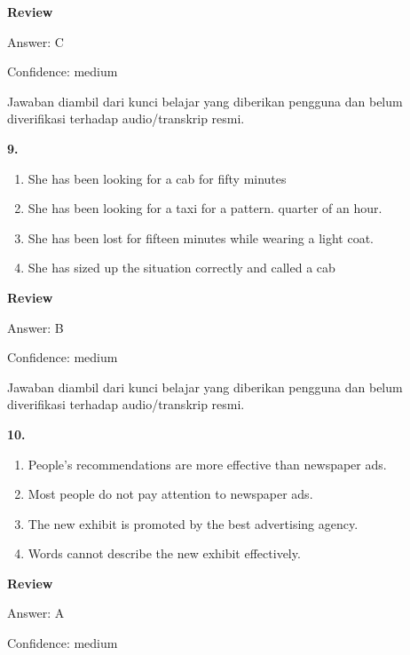 \documentclass[12pt]{article}
\begin{document}
\par
\begingroup
\setlength{\parskip}{0pt}
\setlength{\parindent}{0pt}
\textbf{Review}\par
Answer: C\par
Confidence: medium\par
Jawaban diambil dari kunci belajar yang diberikan pengguna dan belum diverifikasi terhadap audio/transkrip resmi.\par
\endgroup
\par
\vspace{0.25\baselineskip}
\noindent\textbf{9.}
\begin{enumerate}[label=(\Alph*),leftmargin=*,itemsep=0.2em]
\item She has been looking for a cab for fifty minutes
\item She has been looking for a taxi for a pattern. quarter of an hour.
\item She has been lost for fifteen minutes while wearing a light coat.
\item She has sized up the situation correctly and called a cab
\end{enumerate}
\par
\begingroup
\setlength{\parskip}{0pt}
\setlength{\parindent}{0pt}
\textbf{Review}\par
Answer: B\par
Confidence: medium\par
Jawaban diambil dari kunci belajar yang diberikan pengguna dan belum diverifikasi terhadap audio/transkrip resmi.\par
\endgroup
\par
\vspace{0.25\baselineskip}
\noindent\textbf{10.}
\begin{enumerate}[label=(\Alph*),leftmargin=*,itemsep=0.2em]
\item People's recommendations are more effective than newspaper ads.
\item Most people do not pay attention to newspaper ads.
\item The new exhibit is promoted by the best advertising agency.
\item Words cannot describe the new exhibit effectively.
\end{enumerate}
\par
\begingroup
\setlength{\parskip}{0pt}
\setlength{\parindent}{0pt}
\textbf{Review}\par
Answer: A\par
Confidence: medium\par
\end{document}
